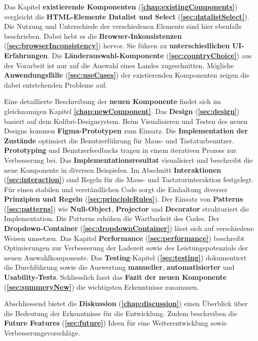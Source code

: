 Das Kapitel \textbf{existierende Komponenten} (\textbf{\ref{chap:existingComponents}}) vergleicht die \textbf{HTML-Elemente Datalist und Select} (\textbf{\ref{sec:datalistSelect}}). 
Die Nutzung und Unterschiede der verschiedenen Elemente sind hier ebenfalls beschrieben. 
Dabei hebt es die \textbf{Browser-Inkonsistenzen} (\textbf{\ref{sec:browserInconsistency}}) hervor. 
Sie führen zu \textbf{unterschiedlichen UI-Erfahrungen}. 
Die \textbf{Länderauswahl-Kom\-po\-nente} (\textbf{\ref{sec:countryChoice}}) aus der Vorarbeit ist nur auf die Auswahl eines Landes zugeschnitten. 
Mögliche \textbf{Anwendungsfälle} (\textbf{\ref{sec:useCases}}) der existierenden Komponenten zeigen die dabei entstehenden Probleme auf. 

Eine detaillierte Beschreibung der \textbf{neuen Komponente} findet sich im gleichnamigen Kapitel \textbf{\ref{chap:newComponent}}. 
Das \textbf{Design} (\textbf{\ref{sec:design}}) basiert auf dem Kolibri-Designsystem. 
Beim Visualisieren und Testen des neuen Designs kommen \textbf{Figma-Prototypen} zum Einsatz. 
Die \textbf{Implementation der Zustände} optimiert die Benutzerführung für Maus- und Tastaturbenutzer. 
\textbf{Prototyping} und Benutzerfeedbacks tragen in einem iterativen Prozess zur Verbesserung bei.
Das \textbf{Implementationsresultat} visualisiert und beschreibt die neue Komponente in diversen Beispielen.
Im Abschnitt \textbf{Interaktionen} (\textbf{\ref{sec:interaction}}) sind Regeln für die Maus- und Tastaturinteraktion festgelegt. 
Für einen stabilen und verständlichen Code sorgt die Einhaltung diverser \textbf{Prinzipien und Regeln} (\textbf{\ref{sec:principleRules}}). 
Der Einsatz von \textbf{Patterns} (\textbf{\ref{sec:patterns}}) wie \textbf{Null-Object}, \textbf{Projector} und \textbf{Decorator} strukturiert die Implementation. 
Die Patterns erhöhen die Wartbarkeit des Codes. 
Der \textbf{Dropdown-Container} (\textbf{\ref{sec:dropdownContainer}}) lässt sich auf verschiedene Weisen umsetzen. 
Das Kapitel \textbf{Performance} (\textbf{\ref{sec:performance}}) beschreibt Optimierungen zur Verbesserung der Ladezeit sowie des Leistungspotenzials der neuen Auswahlkomponente. 
Das \textbf{Testing}-Kapitel (\textbf{\ref{sec:testing}}) dokumentiert die Durchführung sowie die Auswertung \textbf{manueller}, \textbf{automatisierter} und \textbf{Usability-Tests}. 
Schliesslich fasst das \textbf{Fazit der neuen Komponente} (\textbf{\ref{sec:summeryNew}}) die wichtigsten Erkenntnisse zusammen. 

Abschliessend bietet die \textbf{Diskussion} (\textbf{\ref{chap:discussion}}) einen Überblick über die Bedeutung der Erkenntnisse für die Entwicklung. 
Zudem beschreiben die \textbf{Future Features} (\textbf{\ref{sec:future}}) Ideen für eine Weiterentwicklung sowie Verbesserungsvorschläge. 
